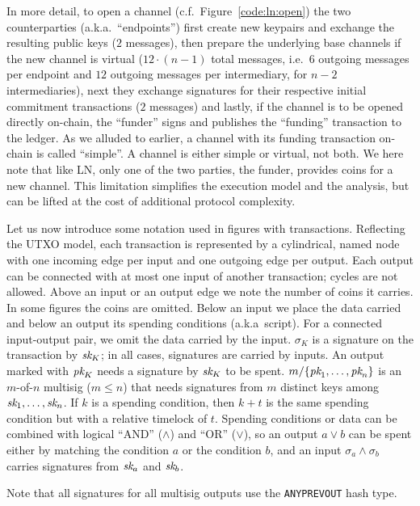   In more detail, to open a channel (c.f.\ Figure~\ref{code:ln:open}) the two
  counterparties (a.k.a.\ ``endpoints'') first create new keypairs and exchange
  the resulting public keys ($2$ messages), then prepare the underlying base
  channels if the new channel is virtual ($12 \cdot (n-1)$ total messages, i.e.\
  $6$ outgoing messages per endpoint and $12$ outgoing messages per
  intermediary, for $n-2$ intermediaries), next they exchange signatures for
  their respective initial commitment transactions ($2$ messages) and lastly, if
  the channel is to be opened directly on-chain, the ``funder'' signs and publishes
  the ``funding'' transaction to the ledger. As we alluded to earlier, a channel
  with its funding transaction on-chain is called ``simple''. A channel is
  either simple or virtual, not both. We here note that like LN, only one of the
  two parties, the funder, provides coins for a new channel. This limitation
  simplifies the execution model and the analysis, but can be lifted at the cost
  of additional protocol complexity.

  Let us now introduce some notation used in figures with transactions.
  Reflecting the UTXO model, each transaction is represented by a cylindrical,
  named node with one incoming edge per input and one outgoing edge per output.
  Each output can be connected with at most one input of another transaction;
  cycles are not allowed. Above an input or an output edge we note the number of
  coins it carries. In some figures the coins are omitted. Below an input we
  place the data carried and below an output its spending conditions (a.k.a\
  script). For
  a connected input-output pair, we omit the data carried by the input.
  $\sigma_K$ is a signature on the transaction by $\textit{sk}_{K}$; in all cases, signatures
  are carried by inputs. An output marked
  with $\textit{pk}_{K}$ needs a signature by $\textit{sk}_{K}$ to be spent. $m/\{\textit{pk}_{1}, \dots,
  \textit{pk}_{n}\}$ is an $m$-of-$n$ multisig ($m \leq n$) that needs signatures from
  $m$ distinct keys among $\textit{sk}_{1}, \dots, \textit{sk}_{n}$. If $k$ is a spending
  condition, then $k + t$ is the same spending condition but with a relative timelock
  of $t$. Spending conditions or data can be combined with logical ``AND''
  ($\wedge$) and ``OR'' ($\vee$), so an output $a \vee b$ can be spent either by
  matching the condition $a$ or the condition $b$, and an input $\sigma_a \wedge
  \sigma_b$ carries signatures from $\textit{sk}_{a}$ and $\textit{sk}_{b}$.

  Note that all signatures for all multisig outputs use the \texttt{ANYPREVOUT}
  hash type.


